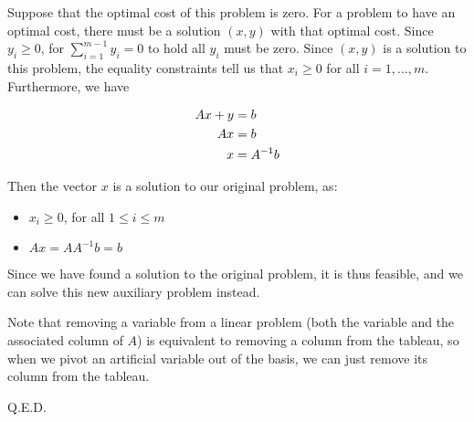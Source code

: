 Suppose that the optimal cost of this problem is zero. For a problem to have an optimal cost, there must be a solution $(x,y)$ with that optimal cost. Since $y_i\geq 0$, for $\sum_{i=1}^{m-1}y_i=0$ to hold all $y_i$ must be zero. Since $(x,y)$ is a solution to this problem, the equality constraints tell us that $x_i\geq 0$ for all $i=1, ...,m$. Furthermore, we have

\begin{align}
	Ax+y&=b\notag\\
	Ax&=b\notag\\
	x&=A^{-1}b \notag\\
\end{align}

Then the vector $x$ is a solution to our original problem, as:
\begin{itemize}
\item $x_i\geq 0$, for all $1\leq i\leq m$
\item $Ax=AA^{-1}b=b$
\end{itemize}

Since we have found a solution to the original problem, it is thus feasible, and we can solve this new auxiliary problem instead.

Note that removing a variable from a linear problem (both the variable and the associated column of $A$) is equivalent to removing a column from the tableau, so when we pivot an artificial variable out of the basis, we can just remove its column from the tableau.

Q.E.D.


